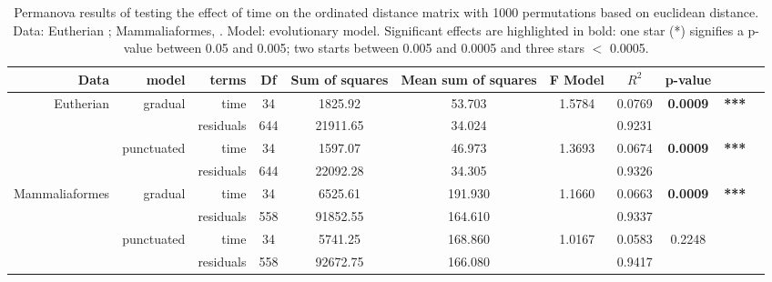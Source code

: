 \documentclass[12pt,letterpaper]{article}
\begin{document}
\begin{landscape}
\begin{table}[ht]
\caption{Permanova results of testing the effect of time on the ordinated distance matrix with 1000 permutations based on euclidean distance. Data: Eutherian \citep[data from][]{beckancient2014}; Mammaliaformes, \citep[data from][]{Slater2012MEE}. Model: evolutionary model. Significant effects are highlighted in bold: one star (*) signifies a p-value between 0.05 and 0.005; two starts between 0.005 and 0.0005 and three stars $<$ 0.0005.}
\label{tab:Tab_permanova}
\centering
\begin{tabular}{rrrcccccccc}
  \hline
 Data & model & terms & Df & Sum of squares & Mean sum of squares & F Model & $R^2$ & p-value & \\ 
  \hline
Eutherian     & gradual    & time      & 34  & 1825.92  & 53.703  & 1.5784 & 0.0769 & \textbf{0.0009}& \textbf{***} \\ 
              &            & residuals & 644 & 21911.65 & 34.024  &        & 0.9231 &  &\\ 
              & punctuated & time      & 34  & 1597.07  & 46.973  & 1.3693 & 0.0674 & \textbf{0.0009}& \textbf{***} \\ 
              &            & residuals & 644 & 22092.28 & 34.305  &        & 0.9326 &  &\\ 
Mammaliaformes & gradual    & time      & 34  & 6525.61  & 191.930 & 1.1660 & 0.0663 & \textbf{0.0009}& \textbf{***} \\ 
              &            & residuals & 558 & 91852.55 & 164.610 &        & 0.9337 &  &\\ 
              & punctuated & time      & 34  & 5741.25  & 168.860 & 1.0167 & 0.0583 & 0.2248 &\\ 
              &            & residuals & 558 & 92672.75 & 166.080 &        & 0.9417 &  &\\ 
   \hline
\end{tabular}
\end{table}
\end{landscape}
\end{document}
